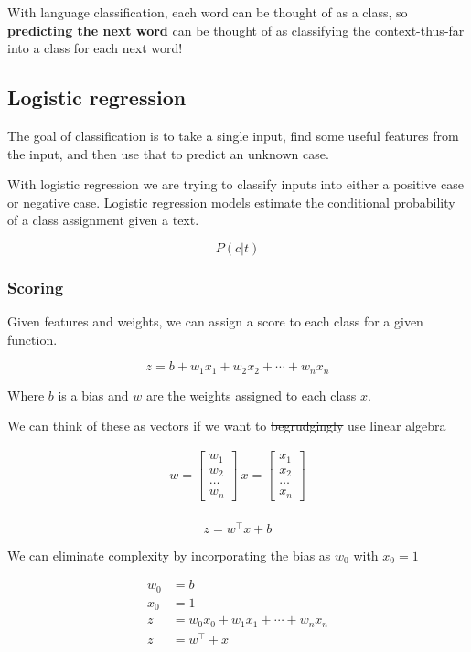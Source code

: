 \documentclass[11pt]{article}
\begin{document}
With language classification, each word can be thought of as a class, so
\textbf{predicting the next word} can be thought of as classifying the
context-thus-far into a class for each next word!

\subsection{Logistic regression}

The goal of classification is to take a single input, find some useful features
from the input, and then use that to predict an unknown case.

With logistic regression we are trying to classify inputs into either a positive
case or negative case. Logistic regression models estimate the conditional
probability of a class assignment given a text.

\[
	P(c|t)
\]

\subsubsection{Scoring}

Given features and weights, we can assign a score to each class for a given
function.

\[
	z = b + w_1x_1 + w_2x_2 + \cdots + w_n x_n
\]

Where $b$ is a bias and $w$ are the weights assigned to each class $x$.

We can think of these as vectors if we want to \st{begrudgingly} use linear
algebra

\begin{align*}
	w =
	\begin{bmatrix}
		w_1 \\ w_2 \\ \dots \\ w_n
	\end{bmatrix} \
	x =
	\begin{bmatrix}
		x_1 \\ x_2 \\ \dots \\ x_n
	\end{bmatrix} \\
\end{align*}

\[
	z = w^\top x + b
\]

We can eliminate complexity by incorporating the bias as $w_0$ with $x_0 = 1$

\begin{align*}
	w_0 & = b                                  \\
	x_0 & = 1                                  \\
	z   & = w_0x_0 + w_1x_1 + \cdots + w_n x_n \\
	z   & = w^\top + x
\end{align*}
\end{document}
